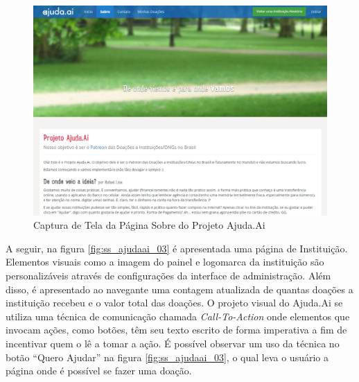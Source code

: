 \begin{figure}[H]
	\caption{\label{fig:ss_ajudaai_02}Captura de Tela da Página Sobre do Projeto Ajuda.Ai}
    \centering
    \includegraphics[scale=0.4]{imagens/screenshot-ajudaai-02.png}
\end{figure}

A seguir, na figura \ref{fig:ss_ajudaai_03} é apresentada uma página de Instituição. Elementos visuais como a imagem do painel e logomarca da instituição são personalizáveis através de configurações da interface de administração. Além disso, é apresentado ao navegante uma contagem atualizada de quantas doações a instituição recebeu e o valor total das doações. O projeto visual do Ajuda.Ai se utiliza uma técnica de comunicação chamada \emph{Call-To-Action} onde elementos que invocam ações, como botões, têm seu texto escrito de forma imperativa a fim de incentivar quem o lê a tomar a ação. É possível observar um uso da técnica no botão ``Quero Ajudar'' na figura \ref{fig:ss_ajudaai_03}, o qual leva o usuário a página onde é possível se fazer uma doação.

